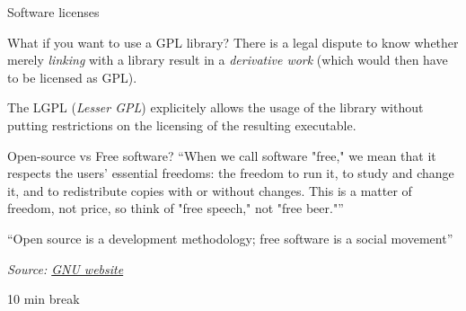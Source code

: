 \documentclass[compress]{beamer}
\newcommand{\source}[2]{{\tiny\it Source: \href{#1}{#2}}}
\begin{document}
\begin{frame}{Software licenses}
    \centering



\end{frame}

\begin{frame}{What if you want to use a GPL library?}
    There is a legal dispute to know whether merely \emph{linking} with a
    library result in a \emph{derivative work} (which would then have to be
    licensed as GPL).

    \pause

    The LGPL (\emph{Lesser GPL}) explicitely allows the usage of the library
    without putting restrictions on the licensing of the resulting executable.

\end{frame}

\begin{frame}{}

    \begin{exampleblock}{Open-source vs Free software?}
    ``When we call software "free," we mean that it respects the users' essential
    freedoms: the freedom to run it, to study and change it, and to redistribute
    copies with or without changes. This is a matter of freedom, not price, so
    think of "free speech," not "free beer."''

        \vspace{1em}
    ``Open source is a development methodology; free software is a social
        movement''

    \end{exampleblock}

    \source{https://www.gnu.org/philosophy/open-source-misses-the-point.en.html}{GNU
    website}
\end{frame}

\begin{frame}[plain]
    \begin{center}
        \Large
        10 min break\\[2em]
    \end{center}
\end{frame}
\end{document}
